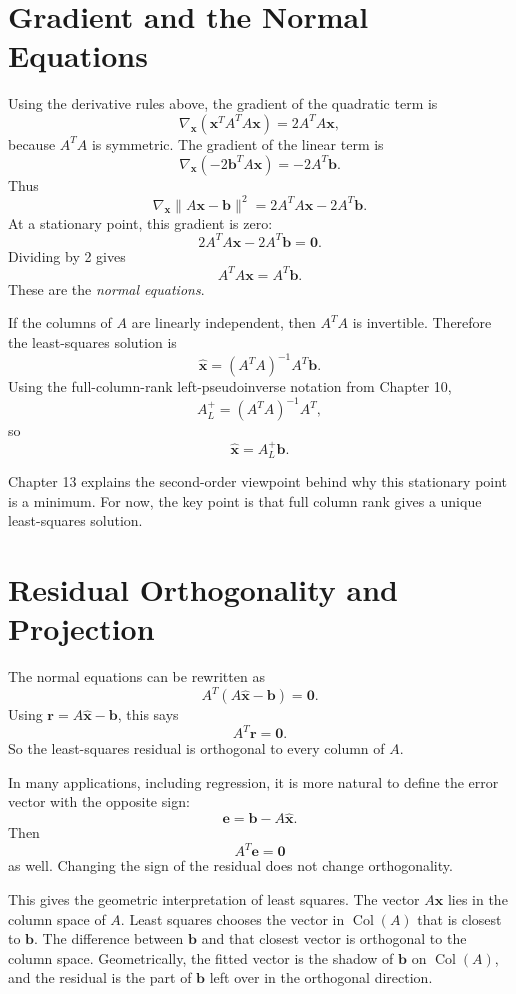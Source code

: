 \section{Gradient and the Normal Equations}
\label{mf:least-squares-gradient}

Using the derivative rules above, the gradient of the quadratic term is
\[
    \nabla_{\mathbf{x}}(\mathbf{x}^T A^T A\mathbf{x})
    =2A^T A\mathbf{x},
\]
because \(A^T A\) is symmetric. The gradient of the linear term is
\[
    \nabla_{\mathbf{x}}(-2\mathbf{b}^T A\mathbf{x})=-2A^T\mathbf{b}.
\]
Thus
\[
    \nabla_{\mathbf{x}}\|A\mathbf{x}-\mathbf{b}\|^2
    =2A^T A\mathbf{x}-2A^T\mathbf{b}.
\]
At a stationary point, this gradient is zero:
\[
    2A^T A\mathbf{x}-2A^T\mathbf{b}=\mathbf{0}.
\]
Dividing by 2 gives
\[
    A^T A\mathbf{x}=A^T\mathbf{b}.
\]
These are the \emph{normal equations}.
\label{mf:least-squares-normal-equations}

If the columns of \(A\) are linearly independent, then \(A^T A\) is invertible. Therefore the least-squares solution is
\[
    \widehat{\mathbf{x}}
    =(A^T A)^{-1}A^T\mathbf{b}.
\]
Using the full-column-rank left-pseudoinverse notation from Chapter 10,
\[
    A^+_L=(A^T A)^{-1}A^T,
\]
so
\[
    \widehat{\mathbf{x}}=A^+_L\mathbf{b}.
\]
\label{mf:least-squares-solution}
\label{mf:least-squares-pseudoinverse}

Chapter 13 explains the second-order viewpoint behind why this stationary point is a minimum. For now, the key point is that full column rank gives a unique least-squares solution.

\section{Residual Orthogonality and Projection}
\label{mf:least-squares-residual-orthogonality}

The normal equations can be rewritten as
\[
    A^T(A\widehat{\mathbf{x}}-\mathbf{b})=\mathbf{0}.
\]
Using \(\mathbf{r}=A\widehat{\mathbf{x}}-\mathbf{b}\), this says
\[
    A^T\mathbf{r}=\mathbf{0}.
\]
So the least-squares residual is orthogonal to every column of \(A\).

In many applications, including regression, it is more natural to define the error vector with the opposite sign:
\[
    \mathbf{e}=\mathbf{b}-A\widehat{\mathbf{x}}.
\]
Then
\[
    A^T\mathbf{e}=\mathbf{0}
\]
as well. Changing the sign of the residual does not change orthogonality.

This gives the geometric interpretation of least squares. The vector \(A\widehat{\mathbf{x}}\) lies in the column space of \(A\). Least squares chooses the vector in \(\operatorname{Col}(A)\) that is closest to \(\mathbf{b}\). The difference between \(\mathbf{b}\) and that closest vector is orthogonal to the column space. Geometrically, the fitted vector is the shadow of \(\mathbf{b}\) on \(\operatorname{Col}(A)\), and the residual is the part of \(\mathbf{b}\) left over in the orthogonal direction.
\label{mf:least-squares-projection-bridge}

